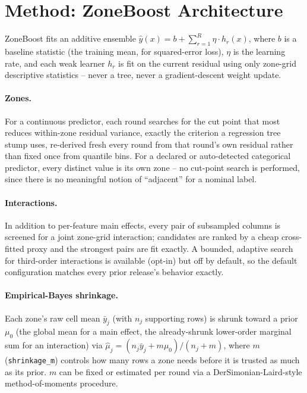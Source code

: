 \documentclass[11pt]{article}
\begin{document}
\section{Method: ZoneBoost Architecture}
\label{sec:method}

ZoneBoost fits an additive ensemble
$\hat{y}(x) = b + \sum_{r=1}^{R} \eta \cdot h_r(x)$, where $b$ is a baseline
statistic (the training mean, for squared-error loss), $\eta$ is the
learning rate, and each weak learner $h_r$ is fit on the current residual
using only zone-grid descriptive statistics -- never a tree, never a
gradient-descent weight update.

\paragraph{Zones.} For a continuous predictor, each round searches for the
cut point that most reduces within-zone residual variance, exactly the
criterion a regression tree stump uses, re-derived fresh every round from
that round's own residual rather than fixed once from quantile bins. For a
declared or auto-detected categorical predictor, every distinct value is its
own zone -- no cut-point search is performed, since there is no meaningful
notion of ``adjacent'' for a nominal label.

\paragraph{Interactions.} In addition to per-feature main effects, every
pair of subsampled columns is screened for a joint zone-grid interaction;
candidates are ranked by a cheap cross-fitted proxy and the strongest pairs
are fit exactly. A bounded, adaptive search for third-order interactions is
available (opt-in) but off by default, so the default configuration matches
every prior release's behavior exactly.

\paragraph{Empirical-Bayes shrinkage.} Each zone's raw cell mean
$\bar{y}_j$ (with $n_j$ supporting rows) is shrunk toward a prior $\mu_0$
(the global mean for a main effect, the already-shrunk lower-order marginal
sum for an interaction) via
$\hat{\mu}_j = (n_j \bar{y}_j + m \mu_0) / (n_j + m)$, where $m$
(\texttt{shrinkage\_m}) controls how many rows a zone needs before it is
trusted as much as its prior. $m$ can be fixed or estimated per round via a
DerSimonian-Laird-style method-of-moments procedure.
\end{document}

